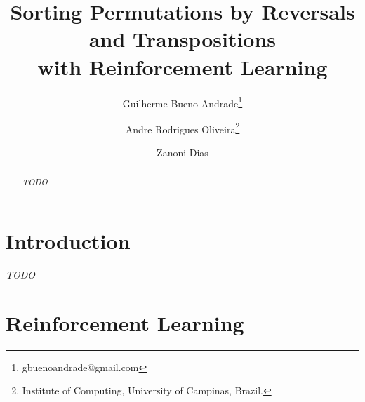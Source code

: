 \documentclass[11pt,twoside]{article}
\begin{document}


%



\TRMakeCover

\pagestyle{myheadings}

\title{Sorting Permutations by Reversals and Transpositions\\ with Reinforcement Learning}

\newcommand*\samethanks[1][\value{footnote}]{\footnotemark[#1]}
\author{Guilherme Bueno Andrade\thanks{gbuenoandrade@gmail.com} \and
Andre Rodrigues Oliveira\thanks{Institute of Computing, University of Campinas, Brazil.} \and Zanoni Dias\samethanks}

\date{}

\maketitle


\begin{abstract} 
\textit{TODO}
\end{abstract}

\section{Introduction}
\label{sec:intro}

\textit{TODO}

\section{Reinforcement Learning}
\label{sec:rl}

\end{document}
